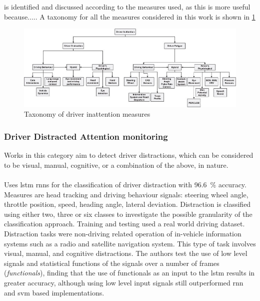 \documentclass[11pt, parskip=half*,twoside=false]{scrbook}
\begin{document}
is identified and discussed according to the measures used, as this is more useful because..... A taxonomy for all the measures considered in this work is shown in \cref{fig:taxonomy_measures}

\begin{figure} 
	\centering
	\includegraphics[width=\textwidth]{inattention_inputs_taxonomy} 
	\caption{Taxonomy of driver inattention measures \citep{koesdwiadyRecentTrendsDriver2017}}
	\label{fig:taxonomy_measures}
\end{figure}

\subsubsection{Driver Distracted Attention monitoring}

Works in this category aim to detect driver distractions, which can be considered to be visual, manual, cognitive, or a combination of the above, in nature. 

\paragraph{\citet{wollmerOnlineDriverDistraction2011}} Uses \gls{lstm} \glspl{rnn} for the classification of driver distraction with 96.6~\% accuracy. Measures are head tracking and driving behaviour signals: steering wheel angle, throttle position, speed, heading angle, lateral deviation.  Distraction is classified using either two, three or six classes to investigate the possible granularity of the classification approach. Training and testing used a real world driving dataset. Distraction tasks were non-driving related operation of in-vehicle information systems such as a radio and satellite navigation system. This type of task involves visual, manual, and cognitive distractions. The authors test the use of low level signals and statistical functions of the signals over a number of frames (\emph{functionals}), finding that the use of functionals as an input to the \gls{lstm} results in greater accuracy, although using low level input signals still outperformed \gls{rnn} and \gls{svm} based implementations.
\end{document}
